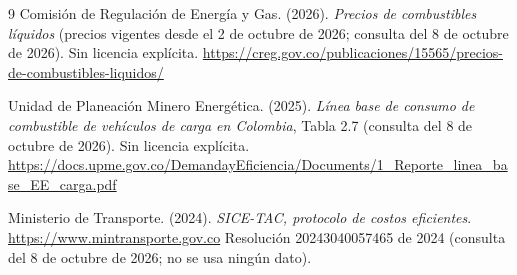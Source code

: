 \documentclass[12pt,a4paper]{article}
\begin{document}
\begin{thebibliography}{9}
Comisión de Regulación de Energía y Gas. (2026). \textit{Precios de
combustibles líquidos} (precios vigentes desde el 2 de octubre de 2026;
consulta del 8 de octubre de 2026). Sin licencia explícita.
\url{https://creg.gov.co/publicaciones/15565/precios-de-combustibles-liquidos/}

Unidad de Planeación Minero Energética. (2025). \textit{Línea base de consumo
de combustible de vehículos de carga en Colombia}, Tabla 2.7 (consulta del 8
de octubre de 2026). Sin licencia explícita.
\url{https://docs.upme.gov.co/DemandayEficiencia/Documents/1_Reporte_linea_base_EE_carga.pdf}

Ministerio de Transporte. (2024). \textit{SICE-TAC, protocolo de costos
eficientes}. \url{https://www.mintransporte.gov.co} Resolución
20243040057465 de 2024 (consulta del 8 de octubre de 2026; no se usa ningún
dato).

\end{thebibliography}
\end{document}
